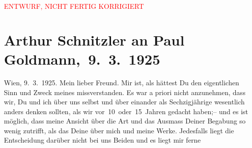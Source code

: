 
\begin{center}
            \textcolor{red}{ENTWURF, NICHT FERTIG KORRIGIERT}
                      \end{center}
            
         
         \renewcommand{\erwaehntePersonen}{Personen: Paul Goldmann}
         \renewcommand{\erwaehnteOrte}{Orte: Berlin, Wien}
         \renewcommand{\erwaehnteWerke}{Werke: Das weite Land. Tragikomödie in fünf Akten}
               \section[ Arthur Schnitzler an Paul Goldmann, 9. 3. 1925]{ Arthur Schnitzler an Paul Goldmann, 9. 3. 1925}\nopagebreak{}\rehead{ }\begin{ledgroupsized}[t]{13cm}\normalsize\beginnumbering \toendnotes[C]{\smallbreak\pagebreak[2]} 
\toendnotes[C]{\smallbreak}\pstart
           \raggedleft{}{\pb}Wien, 9. 3. 1925.\pend
           \pstart{}Mein lieber Freund.\pend\pstart
           Mir ist, als hättest Du den eigentlichen Sinn und Zweck meines \label{K_L03519-1v}\label{K_L03519-1h} missverstanden. Es war a priori nicht anzunehmen, dass wir, Du und ich über
               uns selbst und über einander als Sechzigjährige wesentlich anders denken sollten, als
               wir vor 10 oder 15 Jahren gedacht haben;– und es ist möglich, dass meine Ansicht über
               die Art und das Ausmass Deiner Begabung so wenig zutrifft, als das Deine über mich
               und meine Werke.\pend
           \pstart
           Jedesfalls liegt die Entscheidung darüber nicht bei uns Beiden und es liegt mir ferne

\end{ledgroupsized}
